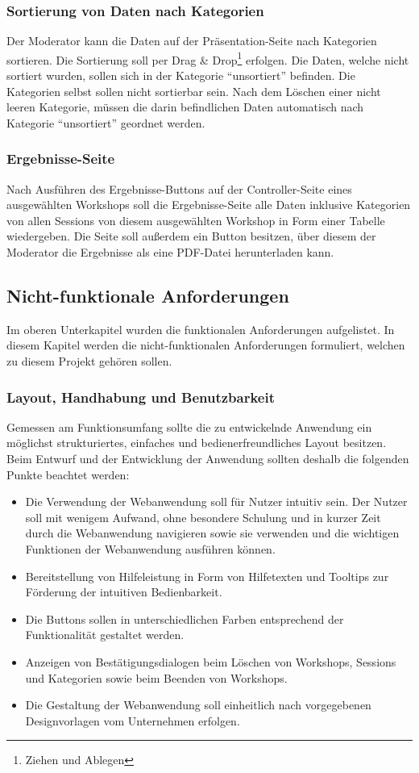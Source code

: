 \subsubsection*{Sortierung von Daten nach Kategorien}
Der Moderator kann die Daten auf der Präsentation-Seite nach Kategorien sortieren. Die Sortierung soll per Drag \& Drop\footnote{Ziehen und Ablegen} erfolgen. Die Daten, welche nicht sortiert wurden, sollen sich in der Kategorie “unsortiert” befinden. Die Kategorien selbst sollen nicht sortierbar sein. Nach dem Löschen einer nicht leeren Kategorie, müssen die darin befindlichen Daten automatisch nach Kategorie “unsortiert” geordnet werden.

\subsubsection*{Ergebnisse-Seite}
Nach Ausführen des Ergebnisse-Buttons auf der Controller-Seite eines ausgewählten Workshops soll die Ergebnisse-Seite alle Daten inklusive Kategorien von allen Sessions von diesem ausgewählten Workshop in Form einer Tabelle wiedergeben. Die Seite soll außerdem ein Button besitzen, über diesem der Moderator die Ergebnisse als eine PDF-Datei herunterladen kann.

\subsection{Nicht-funktionale Anforderungen}
\label{sec:nicht-funktionale anforderungen}
Im oberen Unterkapitel wurden die funktionalen Anforderungen aufgelistet. In diesem Kapitel werden die nicht-funktionalen Anforderungen formuliert, welchen zu diesem Projekt gehören sollen.

\subsubsection*{Layout, Handhabung und Benutzbarkeit}
Gemessen am Funktionsumfang sollte die zu entwickelnde Anwendung ein möglichst strukturiertes, einfaches und bedienerfreundliches Layout besitzen. Beim Entwurf und der Entwicklung der Anwendung sollten deshalb die folgenden Punkte beachtet werden:
\begin{itemize}
\item Die Verwendung der Webanwendung soll für Nutzer intuitiv sein. Der Nutzer soll mit wenigem Aufwand, ohne besondere Schulung und in kurzer Zeit durch die Webanwendung navigieren sowie sie verwenden und die wichtigen Funktionen der Webanwendung ausführen können.
\item Bereitstellung von Hilfeleistung in Form von Hilfetexten und Tooltips zur Förderung der intuitiven Bedienbarkeit.
\item Die Buttons sollen in unterschiedlichen Farben entsprechend der Funktionalität gestaltet werden.
\item Anzeigen von Bestätigungsdialogen beim Löschen von Workshops, Sessions und Kategorien sowie beim Beenden von Workshops.
\item Die Gestaltung der Webanwendung soll einheitlich nach vorgegebenen Designvorlagen vom Unternehmen erfolgen.
\end{itemize}

